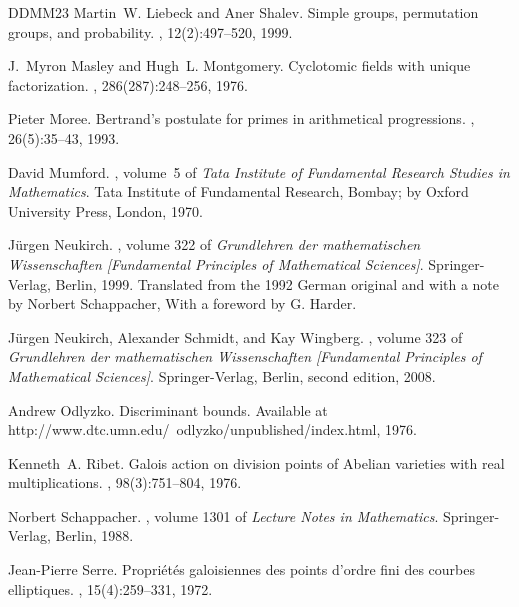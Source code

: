 \documentclass[11pt,a4paper]{article}
\begin{document}
\begin{thebibliography}{DDMM23}
Martin~W. Liebeck and Aner Shalev.
\newblock Simple groups, permutation groups, and probability.
, 12(2):497--520, 1999.

J.~Myron Masley and Hugh~L. Montgomery.
\newblock Cyclotomic fields with unique factorization.
, 286(287):248--256, 1976.

Pieter Moree.
\newblock Bertrand's postulate for primes in arithmetical progressions.
, 26(5):35--43, 1993.

David Mumford.
, volume~5 of {\em Tata Institute of Fundamental Research Studies in Mathematics}.
\newblock Tata Institute of Fundamental Research, Bombay; by Oxford University Press, London, 1970.

J\"urgen Neukirch.
, volume 322 of {\em Grundlehren der mathematischen Wissenschaften [Fundamental Principles of Mathematical Sciences]}.
\newblock Springer-Verlag, Berlin, 1999.
\newblock Translated from the 1992 German original and with a note by Norbert Schappacher, With a foreword by G. Harder.

J\"urgen Neukirch, Alexander Schmidt, and Kay Wingberg.
, volume 323 of {\em Grundlehren der mathematischen Wissenschaften [Fundamental Principles of Mathematical Sciences]}.
\newblock Springer-Verlag, Berlin, second edition, 2008.

Andrew Odlyzko.
\newblock Discriminant bounds.
\newblock Available at http://www.dtc.umn.edu/~odlyzko/unpublished/index.html, 1976.

Kenneth~A. Ribet.
\newblock Galois action on division points of {A}belian varieties with real multiplications.
, 98(3):751--804, 1976.

Norbert Schappacher.
, volume 1301 of {\em Lecture Notes in Mathematics}.
\newblock Springer-Verlag, Berlin, 1988.

Jean-Pierre Serre.
\newblock Propri\'{e}t\'{e}s galoisiennes des points d'ordre fini des courbes elliptiques.
, 15(4):259--331, 1972.


\end{thebibliography}
\end{document}
